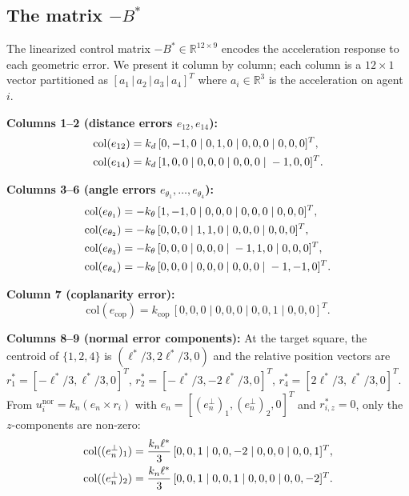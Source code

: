 \documentclass[letterpaper,journal]{IEEEtran}
\theoremstyle{plain}
\theoremstyle{definition}
\theoremstyle{remark}
\begin{document}
\subsection{The matrix \(-B^*\)}
\label{app:Bstar}

The linearized control matrix \(-B^*\in\mathbb R^{12\times 9}\) encodes the acceleration response to each geometric error. We present it column by column; each column is a \(12\times 1\) vector partitioned as \([a_1\,|\,a_2\,|\,a_3\,|\,a_4]^{T}\) where \(a_i\in\mathbb R^{3}\) is the acceleration on agent~\(i\).

\noindent\textbf{Columns 1--2 (distance errors \(e_{12},e_{14}\)):}
\begin{align}
\mathrm{col}(e_{12})&=k_d\,[0,-1,0\;|\;0,1,0\;|\;0,0,0\;|\;0,0,0]^{T},\\
\mathrm{col}(e_{14})&=k_d\,[1,0,0\;|\;0,0,0\;|\;0,0,0\;|\;-1,0,0]^{T}.\notag
\end{align}

\noindent\textbf{Columns 3--6 (angle errors \(e_{\theta_1},\dots,e_{\theta_4}\)):}
\begin{align}
\mathrm{col}(e_{\theta_1})&=-k_\theta\,[1,-1,0\;|\;0,0,0\;|\;0,0,0\;|\;0,0,0]^{T},\\
\mathrm{col}(e_{\theta_2})&=-k_\theta\,[0,0,0\;|\;1,1,0\;|\;0,0,0\;|\;0,0,0]^{T},\notag\\
\mathrm{col}(e_{\theta_3})&=-k_\theta\,[0,0,0\;|\;0,0,0\;|\;-1,1,0\;|\;0,0,0]^{T},\notag\\
\mathrm{col}(e_{\theta_4})&=-k_\theta\,[0,0,0\;|\;0,0,0\;|\;0,0,0\;|\;-1,-1,0]^{T}.\notag
\end{align}

\noindent\textbf{Column 7 (coplanarity error):}
\begin{equation}
\mathrm{col}(e_{\mathrm{cop}})=k_{\mathrm{cop}}\,[0,0,0\;|\;0,0,0\;|\;0,0,1\;|\;0,0,0]^{T}.
\end{equation}

\noindent\textbf{Columns 8--9 (normal error components):} At the target square, the centroid of \(\{1,2,4\}\) is \((\ell^*/3,2\ell^*/3,0)\) and the relative position vectors are \(r_1^*=[-\ell^*/3,\ell^*/3,0]^{T}\), \(r_2^*=[-\ell^*/3,-2\ell^*/3,0]^{T}\), \(r_4^*=[2\ell^*/3,\ell^*/3,0]^{T}\). From \(u_i^{\mathrm{nor}}=k_n(e_n\times r_i)\) with \(e_n=[(e_n^\perp)_1,(e_n^\perp)_2,0]^{T}\) and \(r_{i,z}^*=0\), only the \(z\)-components are non-zero:
\begin{align}
\mathrm{col}((e_n^\perp)_1)&=\frac{k_n\ell^*}{3}\,[0,0,1\;|\;0,0,-2\;|\;0,0,0\;|\;0,0,1]^{T},\\
\mathrm{col}((e_n^\perp)_2)&=\frac{k_n\ell^*}{3}\,[0,0,1\;|\;0,0,1\;|\;0,0,0\;|\;0,0,-2]^{T}.\notag
\end{align}
\end{document}
